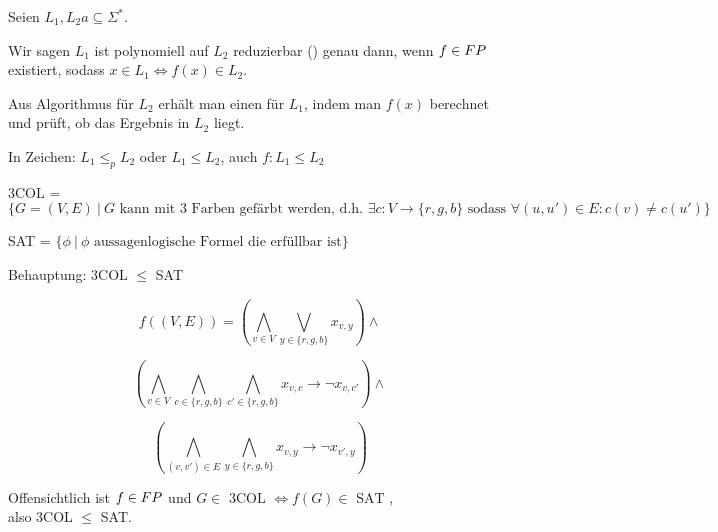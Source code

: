 \begin{definition}


    Seien $L_1, L_2a \subseteq \Sigma^\ast$.

    Wir sagen $L_1$ ist polynomiell auf $L_2$ reduzierbar () genau dann, wenn $f \in FP$ existiert, sodass $x \in L_1 \Leftrightarrow f(x) \in L_2$.

    Aus Algorithmus für $L_2$ erhält man einen für $L_1$, indem man $f(x)$ berechnet und prüft, ob das Ergebnis in $L_2$ liegt.

    In Zeichen: $L_1 \leq_p L_2$ oder $L_1 \leq L_2$, auch $f: L_1 \leq L_2$

\end{definition}


\begin{beispiel}
    
    3COL = $\{ G = (V,E)\ |\ G \text{ kann mit 3 Farben gefärbt werden, d.h. } \exists c: V \rightarrow \{r,g,b\} \text{ sodass } \forall (u, u') \in E: c(v) \neq c(u') \}$

    SAT = $\{ \phi\ |\ \phi \text{ aussagenlogische Formel die erfüllbar ist} \}$


    Behauptung: 3COL $\leq$ SAT






    $$f((V,E)) = \left(     \bigwedge_{v \in V} \bigvee_{y \in \{r,g,b\}}    x_{v,y}    \right)         \land     $$ 

    $$ \left(     \bigwedge_{v \in V} \bigwedge_{c \in \{r,g,b\}} \bigwedge_{c' \in \{r,g,b\}}      x_{v,c} \rightarrow \neg x_{v,c'} \right)       \land     $$

    $$ \left(     \bigwedge_{(v,v') \in E} \bigwedge_{y \in \{r,g,b\}}    x_{v,y} \rightarrow \neg x_{v', y} \right) $$
                                


    Offensichtlich ist $f \in FP$ und $G \in \text{ 3COL } \Leftrightarrow f(G) \in \text{ SAT }$,\\ also 3COL $\leq$ SAT.

\end{beispiel}



